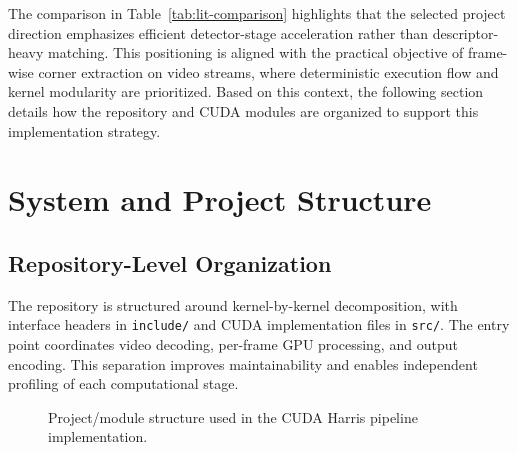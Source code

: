 \documentclass[conference]{IEEEtran}
\begin{document}
The comparison in Table~\ref{tab:lit-comparison} highlights that the selected project direction emphasizes efficient detector-stage acceleration rather than descriptor-heavy matching. This positioning is aligned with the practical objective of frame-wise corner extraction on video streams, where deterministic execution flow and kernel modularity are prioritized. Based on this context, the following section details how the repository and CUDA modules are organized to support this implementation strategy.

\FloatBarrier
\section{System and Project Structure}

\subsection{Repository-Level Organization}
The repository is structured around kernel-by-kernel decomposition, with interface headers in \texttt{include/} and CUDA implementation files in \texttt{src/}. The entry point coordinates video decoding, per-frame GPU processing, and output encoding. This separation improves maintainability and enables independent profiling of each computational stage.

\begin{figure}[t]
\centering
{}
\caption{Project/module structure used in the CUDA Harris pipeline implementation.}
\label{fig:project-structure}
\end{figure}
\end{document}
